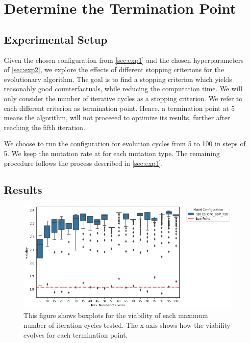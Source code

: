 \documentclass[./../../paper.tex]{subfiles}
\begin{document}
\section{Determine the Termination Point}

\subsection{Experimental Setup}
\label{sec:exp3}
Given the chosen configuration from \autoref{sec:exp1} and the chosen hyperparameters of \autoref{sec:exp2}, we explore the effects of different stopping criterions for the evolutionary algorithm. The goal is to find a stopping criterion which yields reasonably good counterfactuals, while reducing the computation time. We will only consider the number of iterative cycles as a stopping criterion. We refer to each different criterion as termination point. Hence, a termination point at 5 means the algorithm, will not proceeed to optimize its results, further after reaching the fifth iteration.

We choose to run the configuration for evolution cycles from 5 to 100 in steps of 5. We keep the mutation rate at  for each mutation type. The remaining procedure follows the process described in \autoref{sec:exp1}.

\subsection{Results}
\begin{figure}[htbp]
    \centering
    \includegraphics[width=\textwidth]{figures/generated/exp3_cycles_spread.png}
    \caption{This figure shows boxplots for the viability of each maximum number of iteration cycles tested. The x-axis shows how the viability evolves for each termination point.}
    \label{fig:exp3-normalized-lineplot}
\end{figure}
\end{document}

